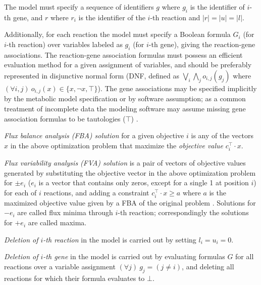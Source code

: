 The model must specify a sequence of identifiers $g$ where $g_i$ is the identifier of $i$-th gene, and $r$ where $r_i$ is the identifier of the $i$-th reaction and $|r| = |u| = |l|$. 

Additionally, for each reaction the model must specify a Boolean formula $G_i$ (for $i$-th reaction) over variables labeled as $g_i$ (for $i$-th gene), giving the reaction-gene associations. The reaction-gene association formulas must possess an efficient evaluation method for a given assignment of variables, and should be preferably represented in disjunctive normal form (DNF, defined as $\bigvee_i\bigwedge_j o_{i,j}(g_j)$ where $(\forall i,j)\ o_{i,j}(x) \in \{x, \neg x, \top\}$). The gene associations may be specified implicitly by the metabolic model specification or by software assumption; as a common treatment of incomplete data the modeling software may assume missing gene association formulas to be tautologies ($\top$) .

\emph{Flux balance analysis (FBA) solution} for a given objective $i$ is any of the vectors $x$ in the above optimization problem that maximize the \emph{objective value} $c_i^\intercal \cdot x$.

\emph{Flux variability analysis (FVA) solution} is a pair of vectors of objective values generated by substituting the objective vector in the above optimization problem for $\pm e_i$ ($e_i$ is a vector that contains only zeros, except for a single 1 at position $i$) for each of $i$ reactions, and adding a constraint $c_i^\intercal\cdot x \geq a$ where $a$ is the maximized objective value given by a FBA of the original problem . Solutions for $-e_i$ are called flux minima through $i$-th reaction; correspondingly the solutions for $+e_i$ are called maxima.

\emph{Deletion of $i$-th reaction} in the model is carried out by setting $l_i = u_i = 0$.

\emph{Deletion of $i$-th gene} in the model is carried out by evaluating formulas $G$ for all reactions over a variable assignment $(\forall j)\ g_j = (j \neq i)$, and deleting all reactions for which their formula evaluates to $\bot$.~\cite{palsson2015systems}

